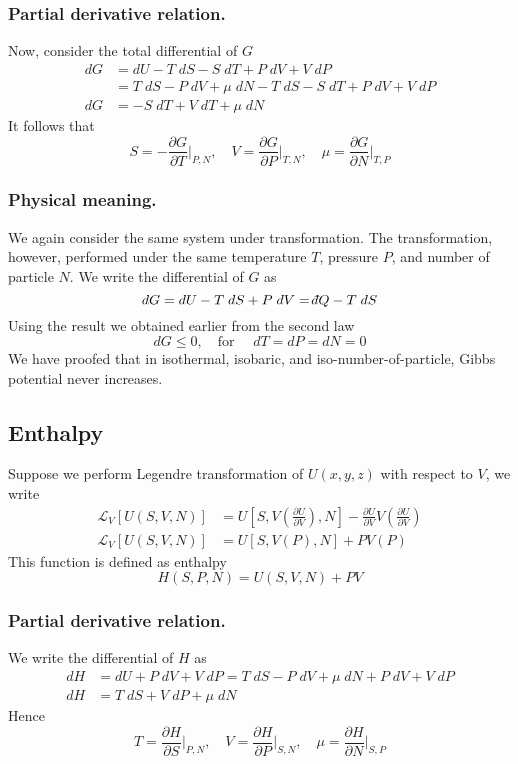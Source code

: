 \documentclass[../../../Main.tex]{subfiles}
\begin{document}
\subsubsection{Partial derivative relation.} Now, consider the total differential of $G$
\begin{align*}
    dG&=dU-T\;dS-S\;dT+P\;dV+V\;dP\\
    &=T\;dS-P\;dV+\mu \;dN-T\;dS-S\;dT+P\;dV+V\;dP\\
    dG&=-S\;dT+V\;dT+\mu\;dN
\end{align*}
It follows that 
\begin{equation*}
    S=-\frac{\partial G}{\partial T}\bigg|_{P,N},\quad V=\frac{\partial G}{\partial P}\bigg|_{T,N},\quad \mu=\frac{\partial G}{\partial N}\bigg|_{T,P}
\end{equation*}

\subsubsection{Physical meaning.} We again consider the same system under transformation. The transformation, however, performed under the same temperature $T$, pressure $P$, and number of particle $N$. We write the differential of $G$ as 
\begin{equation*}
    dG=dU-T\;dS+P\;dV=\dbar Q-T\;dS
\end{equation*}
Using the result we obtained earlier from the second law
\begin{equation*}
    dG \leq0, \quad \text{for }\quad dT=dP=dN=0
\end{equation*}
We have proofed that in isothermal, isobaric, and iso-number-of-particle, Gibbs potential never increases.
\subsection{Enthalpy}
Suppose we perform Legendre transformation of $U(x,y,z)$ with respect to $V$, we write 
\begin{align*}
    \mathcal{L}_V\left[U(S,V,N)\right]&= U\left[S,V\left(\frac{\partial U}{\partial V}\right),N\right]- \frac{\partial U}{\partial V}V\left(\frac{\partial U}{\partial V}\right) \\
    \mathcal{L}_V\left[U(S,V,N)\right]&=U\left[S,V(P),N\right]+PV(P)
\end{align*}
This function is defined as enthalpy
\begin{equation*}
    H(S,P,N)=U(S,V,N)+PV
\end{equation*}
\subsubsection{Partial derivative relation.} We write the differential of $H$ as
\begin{align*}
    dH&=dU+P\;dV+V\;dP=T\;dS-P\;dV+\mu\;dN+P\;dV+V\;dP\\
    dH&=T\;dS+V\;dP+\mu\;dN
\end{align*}
Hence
\begin{equation*}
    T=\frac{\partial H}{\partial S}\bigg|_{P,N}, \quad V=\frac{\partial H}{\partial P}\bigg|_{S,N},\quad \mu=\frac{\partial H}{\partial N}\bigg|_{S,P}
\end{equation*}
\end{document}

